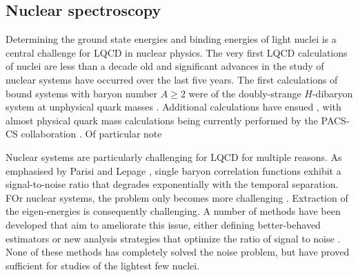 
 

\subsection{Nuclear spectroscopy}

Determining the ground state energies and binding energies of light nuclei is a central challenge for LQCD in nuclear physics. The very first LQCD calculations of nuclei are less than a decade old and significant advances in the study of nuclear systems have occurred over the last five years.
The first calculations of bound systems with baryon number $A\ge2$ were of the doubly-strange $H$-dibaryon system at unphysical quark masses
\cite{Beane:2010hg,Inoue:2010es,Beane:2011xf}. Additional calculations have ensued \cite{Beane:2012vq,Yamazaki:2012hi,Yamazaki:2015asa}, with almost physical quark mass calculations being currently performed by the PACS-CS collaboration \cite{}. Of particular note

Nuclear systems are particularly challenging for LQCD for multiple reasons. As emphasised by Parisi and Lepage \cite{Lepage:1989hd,Parisi:1983ae,Hamber:1983vu}, single baryon correlation functions exhibit a signal-to-noise ratio that degrades exponentially with the temporal separation. FOr nuclear systems, the problem only becomes more challenging \cite{Beane:2009kya,Beane:2009gs}. Extraction of the eigen-energies is consequently challenging. A number of methods have been developed that aim to ameliorate this issue, either defining better-behaved estimators \cite{Beane:2014oea,Wagman:2017gqi,Wagman:2017xfh,Wagman:2016bam,Detmold:2018eqd} or new analysis strategies that optimize the ratio of signal to noise \cite{Detmold:2014hla}. None of these methods has completely solved the noise problem, but have proved sufficient for studies of the lightest few nuclei. 

